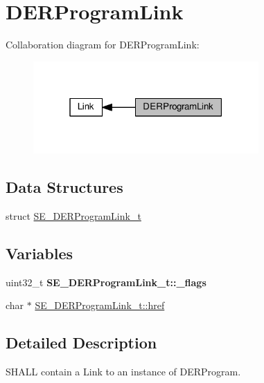 \hypertarget{group__DERProgramLink}{}\section{D\+E\+R\+Program\+Link}
\label{group__DERProgramLink}
Collaboration diagram for D\+E\+R\+Program\+Link\+:\nopagebreak
\begin{figure}[H]
\begin{center}
\leavevmode
\includegraphics[width=244pt]{group__DERProgramLink}
\end{center}
\end{figure}
\subsection*{Data Structures}
\begin{DoxyCompactItemize}
\item 
struct \hyperlink{structSE__DERProgramLink__t}{S\+E\+\_\+\+D\+E\+R\+Program\+Link\+\_\+t}
\end{DoxyCompactItemize}
\subsection*{Variables}
\begin{DoxyCompactItemize}
\item 
\mbox{\label{group__DERProgramLink_gabd34a22adf37f68a3b9c8897057fe9f1}} 
uint32\+\_\+t {\bfseries S\+E\+\_\+\+D\+E\+R\+Program\+Link\+\_\+t\+::\+\_\+flags}
\item 
char $\ast$ \hyperlink{group__DERProgramLink_ga5d47abe94156f8aac48f4fa5a0aae3c6}{S\+E\+\_\+\+D\+E\+R\+Program\+Link\+\_\+t\+::href}
\end{DoxyCompactItemize}


\subsection{Detailed Description}
S\+H\+A\+LL contain a Link to an instance of D\+E\+R\+Program. 

